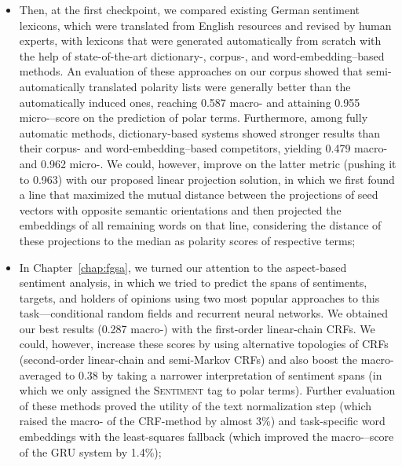 \begin{itemize}
\item Then, at the first checkpoint, we compared existing German
  sentiment lexicons, which were translated from English resources and
  revised by human experts, with lexicons that were generated
  automatically from scratch with the help of state-of-the-art
  dictionary\mbox{-,} corpus\mbox{-,} and word-embedding--based
  methods.  An evaluation of these approaches on our corpus showed
  that semi-automatically translated polarity lists were generally
  better than the automatically induced ones, reaching 0.587
  macro-\F{} and attaining 0.955 micro-\F{}--score on the prediction
  of polar terms.  Furthermore, among fully automatic methods,
  dictionary-based systems showed stronger results than their corpus-
  and word-embedding--based competitors, yielding 0.479 macro-\F{} and
  0.962 micro-\F{}.  We could, however, improve on the latter metric
  (pushing it to 0.963) with our proposed linear projection solution,
  in which we first found a line that maximized the mutual distance
  between the projections of seed vectors with opposite semantic
  orientations and then projected the embeddings of all remaining
  words on that line, considering the distance of these projections to
  the median as polarity scores of respective terms;

\item In Chapter~\ref{chap:fgsa}, we turned our attention to the
  aspect-based sentiment analysis, in which we tried to predict the
  spans of sentiments, targets, and holders of opinions using two most
  popular approaches to this task---conditional random fields and
  recurrent neural networks.  We obtained our best results (0.287
  macro-\F{}) with the first-order linear-chain CRFs.  We could,
  however, increase these scores by using alternative topologies of
  CRFs (second-order linear-chain and semi-Markov CRFs) and also boost
  the macro-averaged \F{} to 0.38 by taking a narrower interpretation
  of sentiment spans (in which we only assigned the \textsc{Sentiment}
  tag to polar terms).  Further evaluation of these methods proved the
  utility of the text normalization step (which raised the macro-\F{}
  of the CRF-method by almost 3\%) and task-specific word embeddings
  with the least-squares fallback (which improved the
  macro-\F{}--score of the GRU system by 1.4\%);


\end{itemize}
